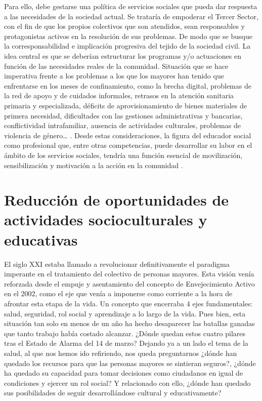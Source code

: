 \documentclass[spanish]{textolivre}
\begin{document}
Para ello, debe gestarse una política de servicios sociales que pueda dar respuesta a las necesidades de la sociedad actual. Se trataría de empoderar el Tercer Sector, con el fin de que los propios colectivos que son atendidos, sean responsables y protagonistas activos en la resolución de sus problemas. De modo que se busque la corresponsabilidad e implicación progresiva del tejido de la sociedad civil. La idea central es que se deberían estructurar los programas y/o actuaciones en función de las necesidades reales de la comunidad. Situación que se hace imperativa frente a los problemas a los que los mayores han tenido que enfrentarse en los meses de confinamiento, como la brecha digital, problemas de la red de apoyo y de cuidados informales, retrasos en la atención sanitaria primaria y especializada, déficits de aprovisionamiento de bienes materiales de primera necesidad, dificultades con las gestiones administrativas y bancarias, conflictividad intrafamiliar, ausencia de actividades culturales, problemas de violencia de género… \cite{merino2020}. %
Desde estas consideraciones, la figura del educador social como profesional que, entre otras competencias, puede desarrollar su labor en el ámbito de los servicios sociales, tendría una función esencial de movilización, sensibilización y motivación a la acción en la comunidad \cite{martinezdemiguel2017}. %

\section{Reducción de oportunidades de actividades socioculturales y educativas}
El siglo XXI estaba llamado a revolucionar definitivamente el paradigma imperante en el tratamiento del colectivo de personas mayores. Esta visión venía reforzada desde el empuje y asentamiento del concepto de Envejecimiento Activo en el 2002, como el eje que venía a imponerse como corriente a la hora de afrontar esta etapa de la vida.  Un concepto que encerraba 4 ejes fundamentales: salud, seguridad, rol social y aprendizaje a lo largo de la vida. Pues bien, esta situación tan solo en menos de un año ha hecho desaparecer las batallas ganadas que tanto trabajo había costado alcanzar. ¿Dónde quedan estos cuatro pilares tras el Estado de Alarma del 14 de marzo? Dejando ya a un lado el tema de la salud, al que nos hemos ido refiriendo, nos queda preguntarnos  ¿dónde han quedado los recursos para que las personas mayores se sintieran seguros?, ¿dónde ha quedado su capacidad para tomar decisiones como ciudadanos en igual de condiciones y ejercer un rol social?  Y relacionado con ello, ¿dónde han quedado sus posibilidades de seguir desarrollándose cultural y educativamente?
\end{document}
